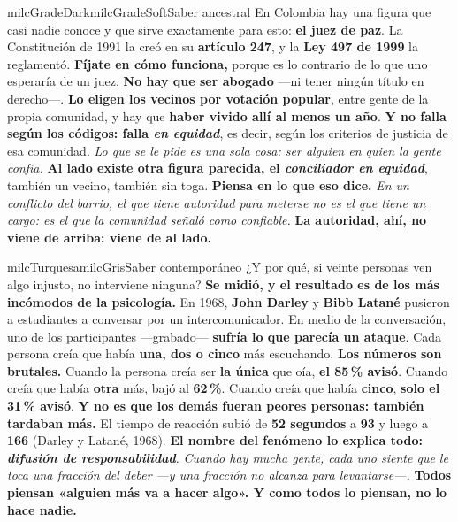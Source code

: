 \documentclass[11pt,letterpaper]{article}
\begin{document}
\begin{softbox}{milcGradeDark}{milcGradeSoft}{Saber ancestral}
En Colombia hay una figura que casi nadie conoce y que sirve exactamente para esto: \textbf{el juez de paz}. La Constitución de 1991 la creó en su \textbf{artículo 247}, y la \textbf{Ley 497 de 1999} la reglamentó. \textbf{Fíjate en cómo funciona,} porque es lo contrario de lo que uno esperaría de un juez. \textbf{No hay que ser abogado} ---ni tener ningún título en derecho---. \textbf{Lo eligen los vecinos por votación popular}, entre gente de la propia comunidad, y hay que \textbf{haber vivido allí al menos un año}. \textbf{Y no falla según los códigos: falla \emph{en equidad}}, es decir, según los criterios de justicia de esa comunidad. \emph{Lo que se le pide es una sola cosa: ser alguien en quien la gente confía.} \textbf{Al lado existe otra figura parecida, el \emph{conciliador en equidad}}, también un vecino, también sin toga. \textbf{Piensa en lo que eso dice.} \emph{En un conflicto del barrio, el que tiene autoridad para meterse no es el que tiene un cargo: es el que la comunidad señaló como confiable.} \textbf{La autoridad, ahí, no viene de arriba: viene de al lado.}
\end{softbox}

\begin{softbox}{milcTurquesa}{milcGris}{Saber contemporáneo}
¿Y por qué, si veinte personas ven algo injusto, no interviene ninguna? \textbf{Se midió, y el resultado es de los más incómodos de la psicología.} En 1968, \textbf{John Darley} y \textbf{Bibb Latané} pusieron a estudiantes a conversar por un intercomunicador. En medio de la conversación, uno de los participantes ---grabado--- \textbf{sufría lo que parecía un ataque}. Cada persona creía que había \textbf{una, dos o cinco} más escuchando. \textbf{Los números son brutales.} Cuando la persona creía ser \textbf{la única} que oía, \textbf{el 85\,\% avisó}. Cuando creía que había \textbf{otra} más, bajó al \textbf{62\,\%}. Cuando creía que había \textbf{cinco}, \textbf{solo el 31\,\% avisó}. \textbf{Y no es que los demás fueran peores personas: también tardaban más.} El tiempo de reacción subió de \textbf{52 segundos} a \textbf{93} y luego a \textbf{166} (Darley y Latané, 1968). \textbf{El nombre del fenómeno lo explica todo: \emph{difusión de responsabilidad}}. \emph{Cuando hay mucha gente, cada uno siente que le toca una fracción del deber ---y una fracción no alcanza para levantarse---.} \textbf{Todos piensan «alguien más va a hacer algo». Y como todos lo piensan, no lo hace nadie.}
\end{softbox}
\end{document}
